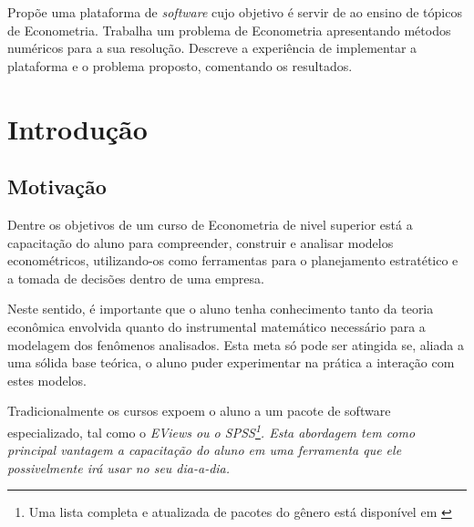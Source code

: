 \documentclass{abnt}
\begin{document}
\folhaderosto
\addtocounter{page}{1}

\vspace{4cm}
Propõe uma plataforma de \textit{software} cujo objetivo é servir de ao ensino de tópicos de Econometria. Trabalha um problema de Econometria apresentando métodos numéricos para a sua resolução. Descreve a experiência de implementar a plataforma e o problema proposto, comentando os resultados.


\newpage




\sumario

\chapter{Introdução}

\section{Motivação}

Dentre os objetivos de um curso de Econometria de nivel superior está a capacitação do aluno para compreender, construir e analisar modelos econométricos, utilizando-os como ferramentas para o planejamento estratético e a tomada de decisões dentro de uma empresa.

Neste sentido, é importante que o aluno tenha conhecimento tanto da teoria econômica envolvida quanto do instrumental matemático necessário para a modelagem dos fenômenos analisados. Esta meta só pode ser atingida se, aliada a uma sólida base teórica, o aluno puder experimentar na prática a interação com estes modelos.

Tradicionalmente os cursos expoem o aluno a um pacote de software especializado, tal como o \em{EViews} ou o \em{SPSS}\footnote{Uma lista completa e atualizada de pacotes do gênero está disponível em \cite{web:econsoftware}}. Esta abordagem tem como principal vantagem a capacitação do aluno em uma ferramenta que ele possivelmente irá usar no seu dia-a-dia. 
\end{document}
